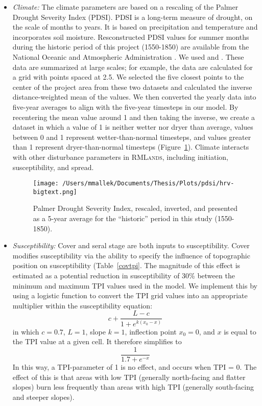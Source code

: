 \begin{itemize}
\item \emph{Climate:} The climate parameters are based on a rescaling of the Palmer Drought Severity Index (PDSI). PDSI is a long-term measure of drought, on the scale of months to years. It is based on precipitation and temperature and incorporates soil moisture. Resconstructed PDSI values for summer months during the historic period of this project (1550-1850) are available from the National Oceanic and Atmospheric Administration . We used \citet{Zhangetal.2004} and \citet{Cook2004}. These data are summarized at large scales; for example, the \citet{Cook2004} data are calculated for a grid with points spaced at 2.5\textdegree. We selected the five closest points to the center of the project area from these two datasets and calculated the inverse distance-weighted mean of the values. We then converted the yearly data into five-year averages to align with the five-year timesteps in our model. By recentering the mean value around 1 and then taking the inverse, we create a dataset in which a value of 1 is neither wetter nor dryer than average, values between 0 and 1 represent wetter-than-normal timesteps, and values greater than 1 represent dryer-than-normal timesteps (Figure~\ref{pdsi}). Climate interacts with other disturbance parameters in \textsc{RMLands}, including initiation, susceptibility, and spread.

\begin{figure}[htbp]
\centering
\texttt{[image: /Users/mmallek/Documents/Thesis/Plots/pdsi/hrv-bigtext.png]}
\caption{Palmer Drought Severity Index, rescaled, inverted, and presented as a 5-year average for the ``historic'' period in this study (1550-1850).} 
\label{pdsi}
\end{figure}


\item \emph{Susceptibility:} Cover and seral stage are both inputs to susceptibility. Cover modifies susceptibility via the ability to specify the influence of topographic position on susceptibility (Table~\ref{covtpi}. The magnitude of this effect is estimated as a potential reduction in susceptibility of 30\% between the minimum and maximum TPI values used in the model. We implement this by using a logistic function to convert the TPI grid values into an appropriate multiplier within the susceptibility equation:
$$c + \frac{L-c}{1+e^{k(x_0-x)}}$$
in which $c= 0.7$, $L=1$, slope $k=1$, inflection point $x_0=0$, and $x$ is equal to the TPI value at a given cell. It therefore simplifies to 
$$\frac{1}{1.7+e^{-x}}$$
In this way, a TPI-parameter of 1 is no effect, and occurs when TPI = 0. The effect of this is that areas with low TPI (generally north-facing and flatter slopes) burn less frequently than areas with high TPI (generally south-facing and steeper slopes).



\end{itemize}
